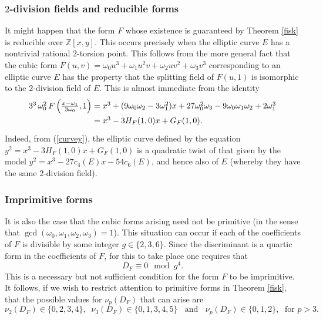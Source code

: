 \subsubsection{$2$-division fields and reducible forms}
It might happen that the form $F$ whose existence is guaranteed by Theorem \ref{fisk} is reducible over $\mathbb{Z}[x,y]$. This occurs precisely when the elliptic curve $E$ has a nontrivial rational $2$-torsion point. This follows from the more general fact that the cubic form $F(u,v) =  \omega_0 u^3 + \omega_1 u^2v + \omega_2 uv^2 + \omega_3 v^3$ corresponding to an elliptic curve $E$ has the property that the splitting field of $F(u,1)$ is isomorphic to the $2$-division field of $E$. This is almost immediate from the identity
$$
\arraycolsep=1.4pt\def\arraystretch{1.4}
\begin{array}{ll}
3^3 \, \omega_0^2 \, F \left( \frac{x-\omega_1}{3 \omega_0},1 \right) & = x^3+(9 \omega_0 \omega_2-3 \omega_1^2) x+27 \omega_0^2 \omega_3-9 \omega_0 \omega_1 \omega_2+2 \omega_1^3 \\
 & = x^3 - 3 H_F(1,0) x  + G_F (1,0). \\
\end{array}
$$
Indeed, from (\ref{curvey}), the elliptic curve defined by the equation
$y^2=x^3 - 3 H_F(1,0) x  + G_F (1,0)$
is a quadratic twist of that given by the model $y^2 = x^3 -27 c_4(E) x -54 c_6(E)$, and hence also of $E$ (whereby they have the same $2$-division field).

\subsubsection{Imprimitive forms}
It is also the case that the cubic forms arising need not be primitive (in the sense that $\gcd 
(\omega_0,\omega_1,\omega_2,\omega_3)=1$). This situation can occur if each of 
the coefficients of $F$ is divisible by some integer $g \in \{ 2, 3, 6 \}$. Since the discriminant is a quartic form in the coefficients of $F$, for this to take place one requires that
$$
D_F \equiv 0 \mod{g^4}.
$$
This is a necessary but not sufficient condition for the form $F$ to be imprimitive. It follows, if we wish to restrict attention to primitive forms in Theorem \ref{fisk}, that the possible values for $\nu_p (D_F)$ that can arise are
\begin{equation} \label{lumpy}
\nu_2 (D_F) \in \{ 0, 2, 3, 4 \}, \; \;  \nu_3 (D_F) \in \{ 0, 1, 3, 4, 5 \} \; \; \mbox{ and } \; \; \nu_p (D_F) \in \{ 0, 1, 2 \}, \; \mbox{ for } p > 3.
\end{equation}


